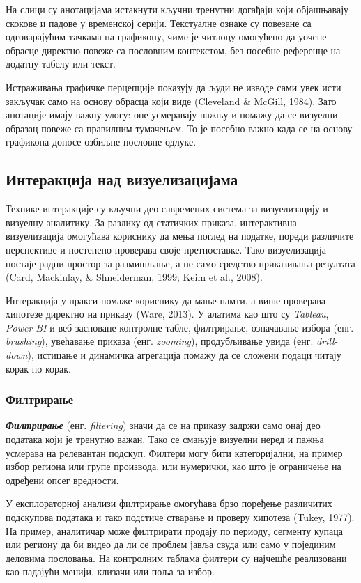 На слици су анотацијама истакнути кључни тренутни догађаји који објашњавају скокове и падове у временској серији. Текстуалне ознаке су повезане са одговарајућим тачкама на графикону, чиме је читаоцу омогућено да уочене обрасце директно повеже са пословним контекстом, без посебне референце на додатну табелу или текст.

Истраживања графичке перцепције показују да људи не изводе сами увек исти закључак само на основу обрасца који виде (Cleveland \& McGill, 1984). Зато анотације имају важну улогу: оне усмеравају пажњу и помажу да се визуелни образац повеже са правилним тумачењем. То је посебно важно када се на основу графикона доносе озбиљне пословне одлуке.

\subsection{Интеракција над визуелизацијама}
Технике интеракције су кључни део савремених система за визуелизацију и визуелну аналитику. За разлику од статичких приказа, интерактивна визуелизација омогућава кориснику да мења поглед на податке, пореди различите перспективе и постепено проверава своје претпоставке. Тако визуелизација постаје радни простор за размишљање, а не само средство приказивања резултата (Card, Mackinlay, \& Shneiderman, 1999; Keim et al., 2008).

Интеракција у пракси помаже кориснику да мање памти, а више проверава хипотезе директно на приказу (Ware, 2013). У алатима као што су \textit{Tableau}, \textit{Power BI} и веб-засноване контролне табле, филтрирање, означавање избора (енг. \textit{brushing}), увећавање приказа (енг. \textit{zooming}), продубљивање увида (енг. \textit{drill-down}), истицање и динамичка агрегација помажу да се сложени подаци читају корак по корак.

\subsubsection{Филтрирање}
\textbf{\textit{Филтрирање}} (енг. \textit{filtering}) значи да се на приказу задржи само онај део података који је тренутно важан. Тако се смањује визуелни неред и пажња усмерава на релевантан подскуп. Филтери могу бити категоријални, на пример избор региона или групе производа, или нумерички, као што је ограничење на одређени опсег вредности.

У експлораторној анализи филтрирање омогућава брзо поређење различитих подскупова података и тако подстиче стварање и проверу хипотеза (Tukey, 1977). На пример, аналитичар може филтрирати продају по периоду, сегменту купаца или региону да би видео да ли се проблем јавља свуда или само у појединим деловима пословања. На контролним таблама филтери су најчешће реализовани као падајући менији, клизачи или поља за избор.

